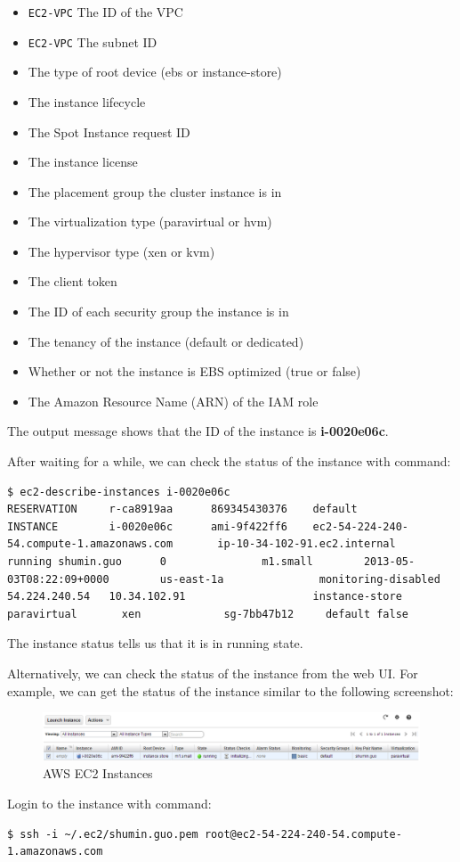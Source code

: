 \begin{itemize}
  \item \verb|EC2-VPC| The ID of the VPC
  \item \verb|EC2-VPC| The subnet ID
  \item The type of root device (ebs or instance-store)
  \item The instance lifecycle
  \item The Spot Instance request ID
  \item The instance license
  \item The placement group the cluster instance is in
  \item The virtualization type (paravirtual or hvm)
  \item The hypervisor type (xen or kvm)
  \item The client token
  \item The ID of each security group the instance is in
  \item The tenancy of the instance (default or dedicated)
  \item Whether or not the instance is EBS optimized (true or false)
  \item The Amazon Resource Name (ARN) of the IAM role
\end{itemize}

The output message shows that the ID of the instance is \textbf{i-0020e06c}.

After waiting for a while, we can check the status of the instance with command:
\lstset{style=bashstyle}
\begin{lstlisting}
$ ec2-describe-instances i-0020e06c
RESERVATION     r-ca8919aa      869345430376    default
INSTANCE        i-0020e06c      ami-9f422ff6    ec2-54-224-240-54.compute-1.amazonaws.com       ip-10-34-102-91.ec2.internal      running shumin.guo      0               m1.small        2013-05-03T08:22:09+0000        us-east-1a               monitoring-disabled      54.224.240.54   10.34.102.91                    instance-store                                  paravirtual       xen             sg-7bb47b12     default false
\end{lstlisting}

The instance status tells us that it is in running state.

Alternatively, we can check the status of the instance from the web UI. For example, we can get the status of the instance similar to the following screenshot:
\begin{figure}[ht]
  \centering
  \includegraphics[width=\textwidth]{figs/5163os_08_21.png}
  \caption{AWS EC2 Instances}\label{fig:aws.ec2.instances}
\end{figure} 
Login to the instance with command:
\lstset{style=bashstyle}
\begin{lstlisting}
$ ssh -i ~/.ec2/shumin.guo.pem root@ec2-54-224-240-54.compute-1.amazonaws.com
\end{lstlisting}

